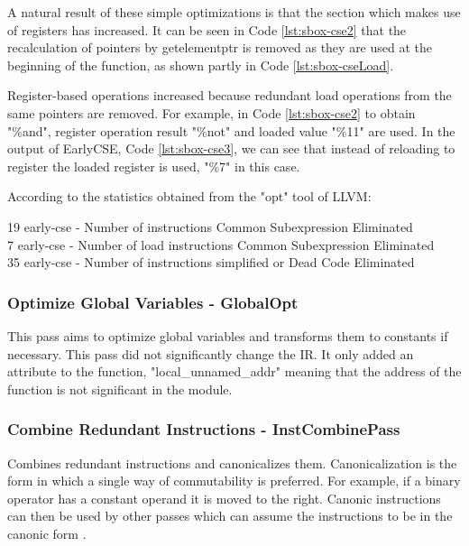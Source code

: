 A natural result of these simple optimizations is that the section which makes use of registers has increased. It can be seen in Code \ref{lst:sbox-cse2} that the recalculation of pointers by getelementptr is removed as they are used at the beginning of the function, as shown partly in Code \ref{lst:sbox-cseLoad}.


 

Register-based operations increased because redundant load operations from the same pointers are removed. For example, in Code \ref{lst:sbox-cse2} to obtain "\%and", register operation result "\%not" and loaded value "\%11" are used. In the output of EarlyCSE, Code \ref{lst:sbox-cse3}, we can see that instead of reloading to register the loaded register is used, "\%7" in this case.

According to the statistics obtained from the "opt" tool of LLVM:
\begin{displayquote}
19 early-cse - Number of instructions Common Subexpression Eliminated \\
 7 early-cse - Number of load instructions Common Subexpression Eliminated \\
35 early-cse - Number of instructions simplified or Dead Code Eliminated \\
\end{displayquote}


\subsubsection{Optimize Global Variables - GlobalOpt}
This pass aims to optimize global variables and transforms them to constants if necessary. This pass did not significantly change the IR. It only added an attribute to the function, "local\_unnamed\_addr" meaning that the address of the function is not significant in the module.



\subsubsection{Combine Redundant Instructions - InstCombinePass}
Combines redundant instructions and canonicalizes them. Canonicalization is the form in which a single way of commutability is preferred. For example, if a binary operator has a constant operand it is moved to the right. Canonic instructions can then be used by other passes which can assume the instructions to be in the canonic form \cite{llvmpass-instcombine}.
\par 

